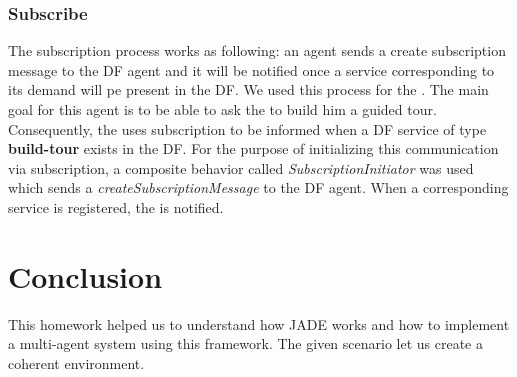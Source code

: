 \documentclass[a4paper,11pt]{article}
\begin{document}
  \subsubsection{Subscribe}
  The subscription process works as following: an agent sends a create subscription message to the DF agent and it will be notified once a
  service corresponding to its demand will pe present in the DF. We used this process for the \pa{}. The main goal for this agent is to be
  able to ask the \to{} to build him a guided tour. Consequently, the \pa{} uses subscription to be informed when a DF service of type
  \textbf{build-tour} exists in the DF. For the purpose of initializing this communication via subscription, a composite behavior called
  \textit{SubscriptionInitiator} was used which sends a \textit{createSubscriptionMessage} to the DF agent. When a corresponding service is
  registered, the \pa{} is notified.
  
  \section{Conclusion}
  
  This homework helped us to understand how JADE works and how to implement a multi-agent system using this framework. The given 
  scenario let us create a coherent environment.
  
\end{document}
